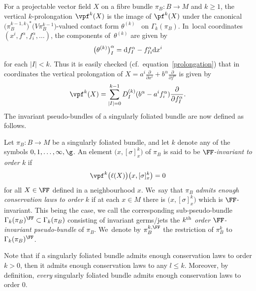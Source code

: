 For a projectable vector field $X$ on a fibre bundle $\pi_{B}\colon B\rightarrow M$ and $k\geq1$, the vertical $k$-prolongation $\vpf^{k}(X)$ is the image of $\pf^{k}(X)$ under the canonical $\big(\pi_{B}^{k-1,k}\big)^{*}\big(V\pi_{B}^{k-1}\big)$-valued contact form $\theta^{(k)}$~\cite[Chapter~6.3]{saunders} on $\Gamma_{k}(\pi_{B})$. In~local coordinates $(x^{i},f^{\alpha},f^{\alpha}_{i},\dots)$, the components of~$\theta^{(k)}$ are given by
\begin{gather*}
\big(\theta^{(k)}\big)^{\alpha}_{I} = {\rm d}f^{\alpha}_{I} - f^{\alpha}_{Ii}{\rm d}x^{i}
\end{gather*}
for each $|I|<k$. Thus it is easily checked (cf.~equation~\eqref{prolongation}) that in coordinates the vertical prolongation of $X = a^{i}\frac{\partial}{\partial x^{i}}+b^{\alpha}\frac{\partial}{\partial f^{\alpha}}$ is given by
\begin{gather*}
\vpf^{k}(X) = \sum_{|I|=0}^{k-1}D_{I}^{(k)}(b^{\alpha}-a^{i}f^{\alpha}_{i})\frac{\partial}{\partial f^{\alpha}_{I}}.
\end{gather*}
The invariant pseudo-bundles of a singularly foliated bundle are now defined as follows.

\begin{Definition}\label{FFinv}
Let $\pi_{B}\colon B\rightarrow M$ be a singularly foliated bundle, and let $k$ denote any of the symbols $0,1,\dots,\infty,\g$. An element $\big(x,[\sigma]^{k}_{x}\big)$ of $\pi_{B}$ is said to be \textit{$\FF$-invariant to order $k$} if
\begin{gather*}
\vpf^{k}\big(\ell(X)\big)\big(x,[\sigma]^{k}_{x}\big) = 0
\end{gather*}
for all $X\in\FF$ defined in a neighbourhood $x$. We~say that $\pi_{B}$ \textit{admits enough conservation laws to order $k$} if at each $x\in M$ there is $\big(x,[\sigma]^{k}_{x}\big)$ which is $\FF$-invariant. This being the case, we call the corresponding sub-pseudo-bundle $\Gamma_{k}(\pi_{B})^{\FF}\subset\Gamma_{k}(\pi_{B})$ consisting of invariant germs/jets the \textit{$k^{\rm th}$ order $\FF$-invariant pseudo-bundle} of $\pi_{B}$. We~denote by $\pi_{B}^{k,\FF}$ the restriction of $\pi_{B}^{k}$ to $\Gamma_{k}(\pi_{B})^{\FF}$.
\end{Definition}

Note that if a singularly foliated bundle admits enough conservation laws to order $k>0$, then it admits enough conservation laws to any $l\leq k$. Moreover, by definition, \textit{every} singularly foliated bundle admits enough conservation laws to order 0.

